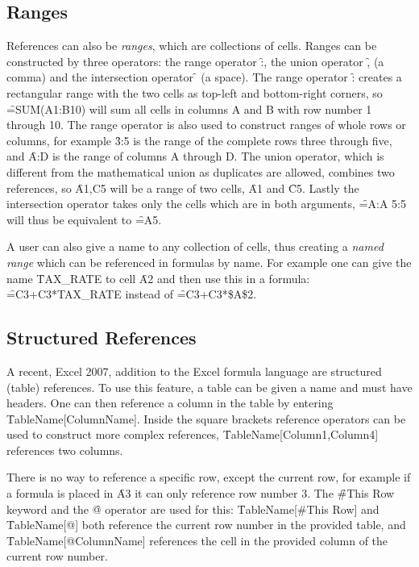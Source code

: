 \subsection{Ranges}
References can also be \emph{ranges}, which are collections of cells.
Ranges can be constructed by three operators: the range operator \f{:}, the union operator \f{,} (a comma) and the intersection operator \f{} (a space).
The range operator \f{:} creates a rectangular range with the two cells as top-left and bottom-right corners, so \f{=SUM(A1:B10)} will sum all cells in columns A and B with row number 1 through 10.
The range operator is also used to construct ranges of whole rows or columns, for example \f{3:5} is the range of the complete rows three through five, and \f{A:D} is the range of columns A through D.
The union operator, which is different from the mathematical union as duplicates are allowed, combines two references, so \f{A1,C5} will be a range of two cells, \f{A1} and \f{C5}.
Lastly the intersection operator takes only the cells which are in both arguments, \f{=A:A 5:5} will thus be equivalent to \f{=A5}.

A user can also give a name to any collection of cells, thus creating a \emph{named range} which can be referenced in formulas by name.
For example one can give the name \f{TAX\_RATE} to cell \f{A2} and then use this in a formula: \f{=C3+C3*TAX\_RATE} instead of \f{=C3+C3*\$A\$2}.

\subsection{Structured References}

A recent, Excel 2007, addition to the Excel formula language are structured (table) references.
To use this feature, a table can be given a name and must have headers.
One can then reference a column in the table by entering \f{TableName[ColumnName]}.
Inside the square brackets reference operators can be used to construct more complex references, \f{TableName[Column1,Column4]} references two columns.

There is no way to reference a specific row, except the current row, for example if a formula is placed in \f{A3} it can only reference row number 3.
The \f{\#This Row} keyword and the \f{@} operator are used for this: \f{TableName[\#This Row]} and \f{TableName[@]} both reference the current row number in the provided table, and \f{TableName[@ColumnName]} references the cell in the provided column of the current row number.

